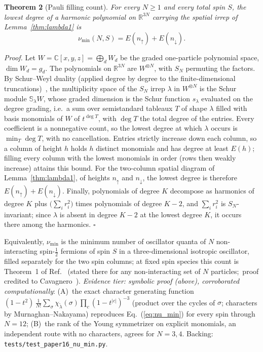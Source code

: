 \documentclass[aps,prl,twocolumn,superscriptaddress,longbibliography]{revtex4-2}
\begin{document}
\noindent\textbf{Theorem 2} (Pauli filling count).
\textit{For every $N \ge 1$ and every total spin $S$, the lowest degree
of a harmonic polynomial on $\mathbb{R}^{3N}$ carrying the spatial
irrep of Lemma~\ref{thm:lambda1} is}
\begin{equation}
  \nu_{\min}(N, S) = E(n_\uparrow) + E(n_\downarrow).
  \label{eq:nu_min}
\end{equation}

\medskip\noindent\textit{Proof.}
Let $W = \mathbb{C}[x,y,z] = \bigoplus_d W_d$ be the graded
one-particle polynomial space, $\dim W_d = g_d$.  The polynomials on
$\mathbb{R}^{3N}$ are $W^{\otimes N}$, with $S_N$ permuting the
factors.  By Schur--Weyl duality (applied degree by degree to the
finite-dimensional truncations)~\cite{FultonHarris1991}, the
multiplicity space of the $S_N$ irrep $\lambda$ in $W^{\otimes N}$ is
the Schur module $\mathbb{S}_\lambda W$, whose graded dimension is the
Schur function $s_\lambda$ evaluated on the degree grading, i.e.\ a sum
over semistandard tableaux $T$ of shape $\lambda$ filled with basis
monomials of $W$ of $t^{\deg T}$, with $\deg T$ the total degree of the
entries.  Every coefficient is a nonnegative count, so the lowest
degree at which $\lambda$ occurs is $\min_T \deg T$, with no
cancellation.  Entries strictly increase down each column, so a column
of height $h$ holds $h$ distinct monomials and has degree at least
$E(h)$; filling every column with the lowest monomials in order
(rows then weakly increase) attains this bound.  For the two-column
spatial diagram of Lemma~\ref{thm:lambda1}, of heights $n_\uparrow$
and $n_\downarrow$, the lowest degree is therefore
$E(n_\uparrow) + E(n_\downarrow)$.  Finally, polynomials of degree $K$
decompose as harmonics of degree $K$ plus $\bigl(\sum_i r_i^2\bigr)$
times polynomials of degree $K-2$, and $\sum_i r_i^2$ is
$S_N$-invariant; since $\lambda$ is absent in degree $K-2$ at the
lowest degree $K$, it occurs there among the harmonics.
\hfill$\square$

\noindent Equivalently, $\nu_{\min}$ is the minimum number of oscillator
quanta of $N$ non-interacting spin-$\tfrac12$ fermions of spin $S$ in a
three-dimensional isotropic oscillator, filled separately for the two
spin columns; at fixed spin species this count is Theorem~1 of
Ref.~\cite{Rittenhouse2006} (stated there for any non-interacting set
of $N$ particles;\ proof credited to Cavagnero~\cite{Cavagnero1986}).  \emph{Evidence tier: symbolic proof
(above), corroborated computationally}: (A)~the exact character
generating function $(1-t^2)\,\frac{1}{N!}\sum_{\sigma}
\chi_{\tilde\lambda}(\sigma) \prod_{c}(1-t^{|c|})^{-3}$ (product over
the cycles of $\sigma$; characters by Murnaghan--Nakayama) reproduces
Eq.~(\ref{eq:nu_min}) for every spin through $N = 12$; (B)~the rank of
the Young symmetrizer on explicit monomials, an independent route with
no characters, agrees for $N = 3, 4$.  Backing:
\texttt{tests/test\_paper16\_nu\_min.py}.
\end{document}
